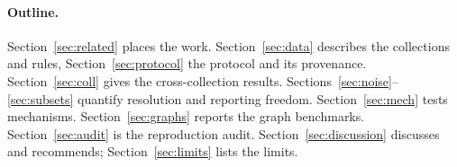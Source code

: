 \paragraph{Outline.} Section~\ref{sec:related} places the work. Section~\ref{sec:data} describes the collections and rules, Section~\ref{sec:protocol} the protocol and its provenance. Section~\ref{sec:coll} gives the cross-collection results. Sections~\ref{sec:noise}--\ref{sec:subsets} quantify resolution and reporting freedom. Section~\ref{sec:mech} tests mechanisms. Section~\ref{sec:graphs} reports the graph benchmarks. Section~\ref{sec:audit} is the reproduction audit. Section~\ref{sec:discussion} discusses and recommends; Section~\ref{sec:limits} lists the limits.
